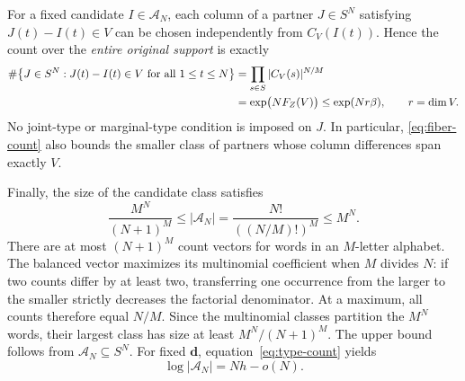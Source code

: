 For a fixed candidate $I\in\mathcal A_N$, each column of a partner
$J\in S^N$ satisfying $J(t)-I(t)\in V$ can be chosen independently
from $C_V(I(t))$.  Hence the count over the \emph{entire original support}
is exactly
\begin{align}
  \#\bigl\{J\in S^N:J(t)-I(t)\in V\ \text{for all }1\leq t\leq N\bigr\}
  &=\prod_{s\in S}|C_V(s)|^{N/M}\notag\\
  &=\exp\bigl(NF_Z(V)\bigr)
   \leq\exp(Nr\beta),\qquad r=\dim V.
  \label{eq:fiber-count}
\end{align}
No joint-type or marginal-type condition is imposed on $J$.
In particular, \eqref{eq:fiber-count} also bounds the smaller class of
partners whose column differences span exactly $V$.

Finally, the size of the candidate class satisfies
\begin{equation}
  \frac{M^N}{(N+1)^M}
  \leq |\mathcal A_N|
  =\frac{N!}{((N/M)!)^M}
  \leq M^N.
  \label{eq:type-count}
\end{equation}
There are at most $(N+1)^M$ count vectors for words in an $M$-letter
alphabet.  The balanced vector maximizes its multinomial coefficient
when $M$ divides $N$: if two counts differ by at least two, transferring
one occurrence from the larger to the smaller strictly decreases the
factorial denominator.  At a maximum, all counts therefore equal
$N/M$.  Since the multinomial classes partition the $M^N$ words, their
largest class has size at least $M^N/(N+1)^M$.  The upper bound follows
from $\mathcal A_N\subseteq S^N$.
For fixed $\mathbf d$, equation~\eqref{eq:type-count} yields
\[
  \log|\mathcal A_N|=Nh-o(N).
\]
